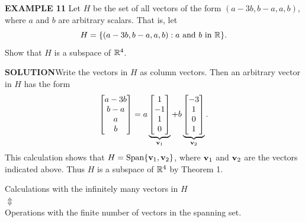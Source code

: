 \begin{frame}[shrink=18]
\textcolor{red!70!black}{\textbf{EXAMPLE 11}}\quad
Let $H$ be the set of all vectors of the form $(a-3b,b-a,a,b)$, where $a$ and $b$ are arbitrary scalars. That is, let
\[
H=\{(a-3b,b-a,a,b):a\text{ and }b\text{ in }\mathbb{R}\}.
\]
Show that $H$ is a subspace of $\mathbb{R}^4$.

\textcolor{red!70!black}{\textbf{SOLUTION}}\quad Write the vectors in $H$ as column vectors. Then an arbitrary vector in $H$ has the form
\[
\begin{bmatrix}a-3b\\b-a\\a\\b\end{bmatrix}
=a\underbrace{\begin{bmatrix}1\\-1\\1\\0\end{bmatrix}}_{\mathbf{v}_1}
+b\underbrace{\begin{bmatrix}-3\\1\\0\\1\end{bmatrix}}_{\mathbf{v}_2}.
\]
This calculation shows that $H=\operatorname{Span}\{\mathbf{v}_1,\mathbf{v}_2\}$, where $\mathbf{v}_1$ and $\mathbf{v}_2$ are the vectors indicated above. Thus $H$ is a subspace of $\mathbb{R}^4$ by Theorem 1.

\begin{center}
Calculations with the infinitely many vectors in $H$\\[-.2ex]
$\Updownarrow$\\[-.2ex]
Operations with the finite number of vectors in the spanning set.
\end{center}
\end{frame}

